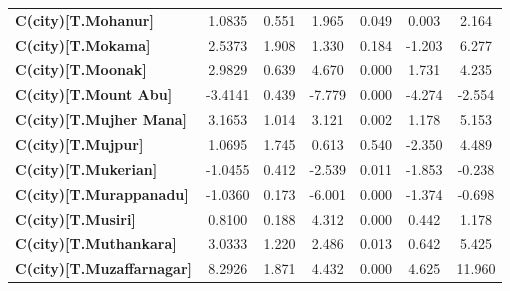 \begin{center}
\begin{tabular}{lcccccc}
\textbf{C(city)[T.Mohanur]}                                                                         &       1.0835  &        0.551     &     1.965  &         0.049        &        0.003    &        2.164     \\
\textbf{C(city)[T.Mokama]}                                                                          &       2.5373  &        1.908     &     1.330  &         0.184        &       -1.203    &        6.277     \\
\textbf{C(city)[T.Moonak]}                                                                          &       2.9829  &        0.639     &     4.670  &         0.000        &        1.731    &        4.235     \\
\textbf{C(city)[T.Mount Abu]}                                                                       &      -3.4141  &        0.439     &    -7.779  &         0.000        &       -4.274    &       -2.554     \\
\textbf{C(city)[T.Mujher Mana]}                                                                     &       3.1653  &        1.014     &     3.121  &         0.002        &        1.178    &        5.153     \\
\textbf{C(city)[T.Mujpur]}                                                                          &       1.0695  &        1.745     &     0.613  &         0.540        &       -2.350    &        4.489     \\
\textbf{C(city)[T.Mukerian]}                                                                        &      -1.0455  &        0.412     &    -2.539  &         0.011        &       -1.853    &       -0.238     \\
\textbf{C(city)[T.Murappanadu]}                                                                     &      -1.0360  &        0.173     &    -6.001  &         0.000        &       -1.374    &       -0.698     \\
\textbf{C(city)[T.Musiri]}                                                                          &       0.8100  &        0.188     &     4.312  &         0.000        &        0.442    &        1.178     \\
\textbf{C(city)[T.Muthankara]}                                                                      &       3.0333  &        1.220     &     2.486  &         0.013        &        0.642    &        5.425     \\
\textbf{C(city)[T.Muzaffarnagar]}                                                                   &       8.2926  &        1.871     &     4.432  &         0.000        &        4.625    &       11.960     \\

\end{tabular}
\end{center}
